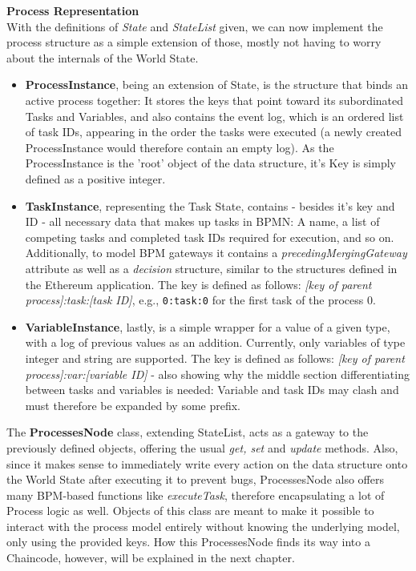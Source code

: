 \textbf{Process Representation} \\[0.2em]
With the definitions of \emph{State} and \emph{StateList} given, we can now implement the process structure as a simple extension of those, mostly not having to worry about the internals of the World State. 
\begin{itemize}
    \item \textbf{ProcessInstance}, being an extension of State, is the structure that binds an active process together: It stores the keys that point toward its subordinated Tasks and Variables, and also contains the event log, which is an ordered list of task IDs, appearing in the order the tasks were executed (a newly created ProcessInstance would therefore contain an empty log). As the ProcessInstance is the 'root' object of the data structure, it's Key is simply defined as a positive integer.
    \item \textbf{TaskInstance}, representing the Task State, contains - besides it's key and ID - all necessary data that makes up tasks in BPMN: A name, a list of competing tasks and completed task IDs required for execution, and so on. Additionally, to model BPM gateways it contains a \emph{precedingMergingGateway} attribute as well as a \emph{decision} structure, similar to the structures defined in the Ethereum application. The key is defined as follows: \emph{[key of parent process]:task:[task ID]}, e.g., \texttt{0:task:0} for the first task of the process 0.
    \item \textbf{VariableInstance}, lastly, is a simple wrapper for a value of a given type, with a log of previous values as an addition. Currently, only variables of type integer and string are supported. The key is defined as follows: \emph{[key of parent process]:var:[variable ID]} - also showing why the middle section differentiating between tasks and variables is needed: Variable and task IDs may clash and must therefore be expanded by some prefix.
\end{itemize}
The \textbf{ProcessesNode} class, extending StateList, acts as a gateway to the previously defined objects, offering the usual \emph{get, set} and \emph{update} methods. Also, since it makes sense to immediately write every action on the data structure onto the World State after executing it to prevent bugs, ProcessesNode also offers many BPM-based functions like \emph{executeTask}, therefore encapsulating a lot of Process logic as well. Objects of this class are meant to make it possible to interact with the process model entirely without knowing the underlying model, only using the provided keys. \newline
How this ProcessesNode finds its way into a Chaincode, however, will be explained in the next chapter.

